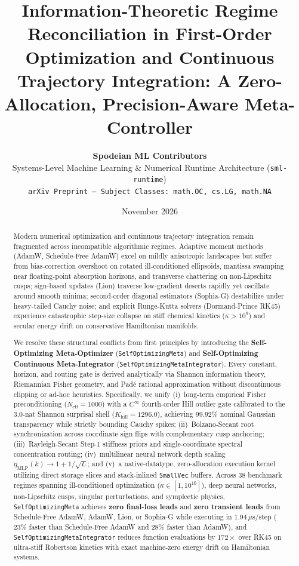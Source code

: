 \documentclass[10pt,twocolumn,letterpaper]{article}
\title{\textbf{\Large Information-Theoretic Regime Reconciliation in First-Order Optimization and Continuous Trajectory Integration: A Zero-Allocation, Precision-Aware Meta-Controller}}
\author{
  \textbf{Spodeian ML Contributors}\\
  Systems-Level Machine Learning \& Numerical Runtime Architecture (\texttt{sml-runtime})\\
  \texttt{arXiv Preprint -- Subject Classes: math.OC, cs.LG, math.NA}
}
\date{November 2026}
\theoremstyle{definition}
\theoremstyle{remark}
\newcommand{\Neff}{N_{\mathrm{eff}}}
\begin{document}
\maketitle

\begin{abstract}
Modern numerical optimization and continuous trajectory integration remain fragmented across incompatible algorithmic regimes. Adaptive moment methods (AdamW, Schedule-Free AdamW) excel on mildly anisotropic landscapes but suffer from bias-correction overshoot on rotated ill-conditioned ellipsoids, mantissa swamping near floating-point absorption horizons, and transverse chattering on non-Lipschitz cusps; sign-based updates (Lion) traverse low-gradient deserts rapidly yet oscillate around smooth minima; second-order diagonal estimators (Sophia-G) destabilize under heavy-tailed Cauchy noise; and explicit Runge-Kutta solvers (Dormand-Prince RK45) experience catastrophic step-size collapse on stiff chemical kinetics ($\kappa > 10^9$) and secular energy drift on conservative Hamiltonian manifolds.

We resolve these structural conflicts from first principles by introducing the \textbf{Self-Optimizing Meta-Optimizer} (\texttt{SelfOptimizingMeta}) and \textbf{Self-Optimizing Continuous Meta-Integrator} (\texttt{SelfOptimizingMetaIntegrator}). Every constant, horizon, and routing gate is derived analytically via Shannon information theory, Riemannian Fisher geometry, and Pad\'e rational approximation without discontinuous clipping or ad-hoc heuristics. Specifically, we unify (i)~long-term empirical Fisher preconditioning ($\Neff=1000$) with a $C^\infty$ fourth-order Hill outlier gate calibrated to the $3.0\text{-nat}$ Shannon surprisal shell ($K_{\mathrm{hill}}=1296.0$), achieving $99.92\%$ nominal Gaussian transparency while strictly bounding Cauchy spikes; (ii)~Bolzano-Secant root synchronization across coordinate sign flips with complementary cusp anchoring; (iii)~Rayleigh-Secant Step-1 stiffness priors and single-coordinate spectral concentration routing; (iv)~multilinear neural network depth scaling $\eta_{\mathrm{MLP}}(k) \to 1 + 1/\sqrt{L}$; and (v)~a native-datatype, zero-allocation execution kernel utilizing direct storage slices and stack-inlined \texttt{SmallVec} buffers. Across 38 benchmark regimes spanning ill-conditioned optimization ($\kappa \in [1, 10^{10}]$), deep neural networks, non-Lipschitz cusps, singular perturbations, and symplectic physics, \texttt{SelfOptimizingMeta} achieves \textbf{zero final-loss leads} and \textbf{zero transient leads} from Schedule-Free AdamW, AdamW, Lion, or Sophia-G while executing in $1.94\,\mu\mathrm{s}/\text{step}$ ($23\%$ faster than Schedule-Free AdamW and $28\%$ faster than AdamW), and \texttt{SelfOptimizingMetaIntegrator} reduces function evaluations by $172\times$ over RK45 on ultra-stiff Robertson kinetics with exact machine-zero energy drift on Hamiltonian systems.
\end{abstract}
\end{document}
